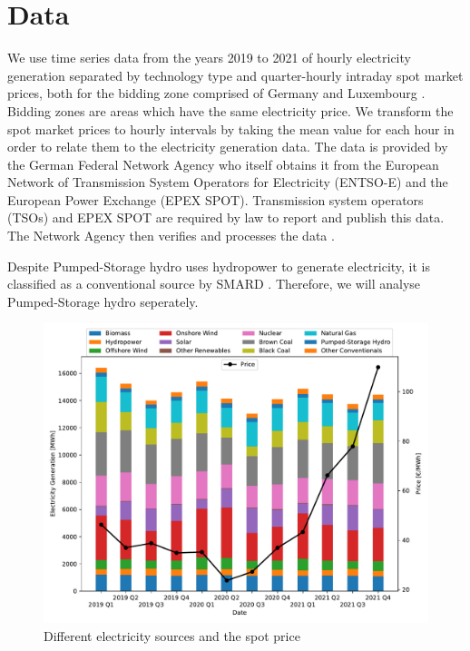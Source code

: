 \documentclass{article}
\begin{document}
\section{Data}
We use time series data from the years 2019 to 2021 of hourly electricity generation separated by technology type and quarter-hourly intraday spot market prices, both for the bidding zone comprised of Germany and Luxembourg \citep{smard}.
Bidding zones are areas which have the same electricity price.
We transform the spot market prices to hourly intervals by taking the mean value for each hour in order to relate them to the electricity generation data.
The data is provided by the German Federal Network Agency who itself obtains it from the European Network of Transmission System Operators for Electricity (ENTSO-E) and the European Power Exchange (EPEX SPOT).
Transmission system operators (TSOs) and EPEX SPOT are required by law to report and publish this data.
The Network Agency then verifies and processes the data \citep{smard_usermanual}.

Despite Pumped-Storage hydro uses hydropower to generate electricity, it is classified as a conventional source by SMARD \citep{smard_usermanual}. Therefore, we will analyse Pumped-Storage hydro seperately.  

\begin{figure}[h]
    \centering
    \includegraphics[width=0.8\columnwidth]{doc/fig/quarterly_technology_mix_with_price.pdf}
    \caption{Different electricity sources and the spot price}
    \label{fig:quarterly_mix}
\end{figure}
\end{document}

